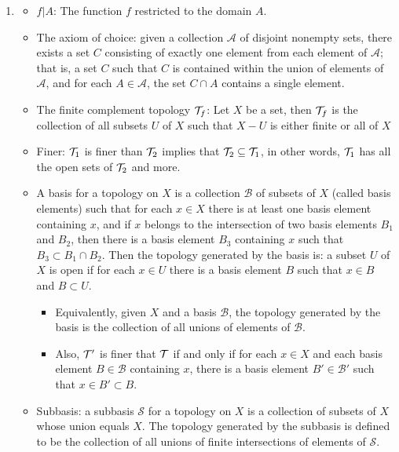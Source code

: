 \documentclass[12pt,letterpaper]{article}
\begin{document}
\begin{enumerate}
  \item \label{sec:EarlyChapters} \begin{itemize} Basics, before continuity.
    \item \label{dfn:functionRestriction} $f|A$: The function $f$ restricted to the domain $A$.
    \item \label{thm:AxiomChoice} The axiom of choice: given a collection $\mathcal{A}$ of disjoint nonempty sets, there exists a set $C$ consisting of exactly one element from each element of $\mathcal{A}$; that is, a set $C$ such that $C$ is contained within the union of elements of $\mathcal{A}$, and for each $A\in\mathcal{A}$, the set $C\cap A$ contains a single element.
    \item \label{dfn:finiteComplementTopology} The finite complement topology $\mathcal{T}_f$: Let $X$ be a set, then $\mathcal{T}_f$ is the collection of all subsets $U$ of $X$ such that $X-U$ is either finite or all of $X$
    \item \label{dfn:finer} Finer: $\mathcal{T}_1$ is finer than $\mathcal{T}_2$ implies that $\mathcal{T}_2\subseteq \mathcal{T}_1$, in other words, $\mathcal{T}_1$ has all the open sets of $\mathcal{T}_2$ and more.
    \item \label{dfn:basis} A basis for a topology on $X$ is a collection $\mathcal{B}$ of subsets of $X$ (called basis elements) such that for each $x\in X$ there is at least one basis element containing $x$, and if $x$ belongs to the intersection of two basis elements $B_1$ and $B_2$, then there is a basis element $B_3$ containing $x$ such that $B_3 \subset B_1 \cap B_2$. Then the topology generated by the basis is: a subset $U$ of $X$ is open if for each $x\in U$ there is a basis element $B$ such that $x\in B$ and $B\subset U$.
    \begin{itemize}
      \item \label{thm:basisUnion} Equivalently, given $X$ and a basis $\mathcal{B}$, the topology generated by the basis is the collection of all unions of elements of $\mathcal{B}$.
      \item \label{thm:basisFiner} Also, $\mathcal{T}'$ is finer that $\mathcal{T}$ if and only if for each $x\in X$ and each basis element $B\in\mathcal{B}$ containing $x$, there is a basis element $B'\in \mathcal{B}'$ such that $x\in B'\subset B$.
    \end{itemize}
    \item \label{dfn:subbasis} Subbasis: a subbasis $\mathcal{S}$ for a topology on $X$ is a collection of subsets of $X$ whose union equals $X$. The topology generated by the subbasis is defined to be the collection of all unions of finite intersections of elements of $\mathcal{S}$.

\end{itemize}
\end{enumerate}
\end{document}
